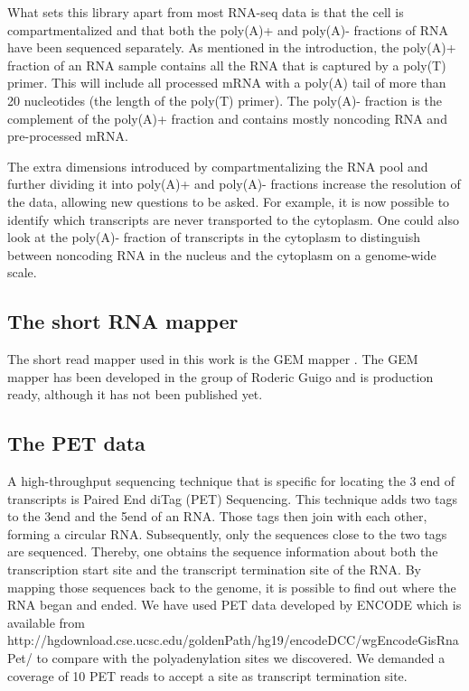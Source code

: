 What sets this library apart from most RNA-seq data is that the cell is
compartmentalized and that both the poly(A)+ and poly(A)- fractions of RNA have
been sequenced separately. As mentioned in the introduction, the poly(A)+
fraction of an RNA sample contains all the RNA that is captured by a poly(T)
primer. This will include all processed mRNA with a poly(A) tail of more than
20 nucleotides (the length of the poly(T) primer). The poly(A)- fraction is the
complement of the poly(A)+ fraction and contains mostly noncoding RNA and
pre-processed mRNA.

The extra dimensions introduced by compartmentalizing the RNA pool and further
dividing it into poly(A)+ and poly(A)- fractions increase the resolution of the
data, allowing new questions to be asked. For example, it is now possible to
identify which transcripts are never transported to the cytoplasm. One could
also look at the poly(A)- fraction of transcripts in the cytoplasm to
distinguish between noncoding RNA in the nucleus and the cytoplasm on a
genome-wide scale.

\subsection{The short RNA mapper}
The short read mapper used in this work is the GEM mapper
\cite{ribeca_gem_2010}. The GEM mapper has been developed in the group of
Roderic Guigo and is production ready, although it has not been published yet.

\subsection{The PET data}
A high-throughput sequencing technique that is specific for locating the 3\p
end of transcripts is Paired End diTag (PET) Sequencing. This technique
adds two tags to the 3\p end and the 5\p end of an RNA. Those tags then join
with each other, forming a circular RNA. Subsequently, only the sequences close
to the two tags are sequenced. Thereby, one obtains the sequence information
about both the transcription start site and the transcript termination site of
the RNA. By mapping those sequences back to the genome, it is possible to find
out where the RNA began and ended. We have used PET data developed by ENCODE
which is available from
http://hgdownload.cse.ucsc.edu/goldenPath/hg19/encodeDCC/wgEncodeGisRnaPet/ to
compare with the polyadenylation sites we discovered. We demanded a coverage of
10 PET reads to accept a site as transcript termination site.

